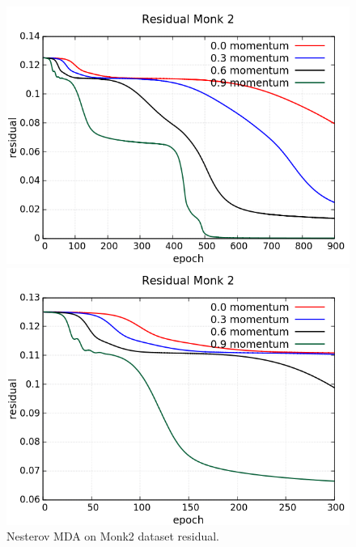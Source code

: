 \begin{figure}[H]
	\centering
	\begin{minipage}[t]{0.5\linewidth}
		\includegraphics[width=\linewidth]{data/MGD/Monk2/NM/Monk2_NMGD_Residual_standard.png}
	\end{minipage}%
	\begin{minipage}[t]{0.5\linewidth}
		\includegraphics[width=\linewidth]{data/MGD/Monk2/NM/Monk2_NMGD_Residual_zoom.png}
	\end{minipage}
	\caption{Nesterov MDA on Monk2 dataset residual.}
\end{figure}
